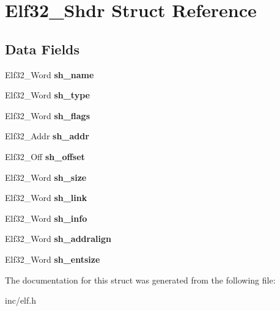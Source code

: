 \hypertarget{structElf32__Shdr}{}\section{Elf32\+\_\+\+Shdr Struct Reference}
\label{structElf32__Shdr}
\subsection*{Data Fields}
\begin{DoxyCompactItemize}
\item 
Elf32\+\_\+\+Word {\bfseries sh\+\_\+name}\hypertarget{structElf32__Shdr_a6e8fd300ca473a31d0f65817ce371dfd}{}\label{structElf32__Shdr_a6e8fd300ca473a31d0f65817ce371dfd}

\item 
Elf32\+\_\+\+Word {\bfseries sh\+\_\+type}\hypertarget{structElf32__Shdr_aab6c221dbd7e16987df41280fb915408}{}\label{structElf32__Shdr_aab6c221dbd7e16987df41280fb915408}

\item 
Elf32\+\_\+\+Word {\bfseries sh\+\_\+flags}\hypertarget{structElf32__Shdr_a27e003d8da37de3038a0065577a7743d}{}\label{structElf32__Shdr_a27e003d8da37de3038a0065577a7743d}

\item 
Elf32\+\_\+\+Addr {\bfseries sh\+\_\+addr}\hypertarget{structElf32__Shdr_a7e668a62cee74a2f9c6edabb5f45635a}{}\label{structElf32__Shdr_a7e668a62cee74a2f9c6edabb5f45635a}

\item 
Elf32\+\_\+\+Off {\bfseries sh\+\_\+offset}\hypertarget{structElf32__Shdr_a6e37227a5777cddc0a9dbbb3c2598ec1}{}\label{structElf32__Shdr_a6e37227a5777cddc0a9dbbb3c2598ec1}

\item 
Elf32\+\_\+\+Word {\bfseries sh\+\_\+size}\hypertarget{structElf32__Shdr_a84dc67bb0ab65880bbcd74fbee722ff1}{}\label{structElf32__Shdr_a84dc67bb0ab65880bbcd74fbee722ff1}

\item 
Elf32\+\_\+\+Word {\bfseries sh\+\_\+link}\hypertarget{structElf32__Shdr_ad759308388eb14c5c6e4d636c38999da}{}\label{structElf32__Shdr_ad759308388eb14c5c6e4d636c38999da}

\item 
Elf32\+\_\+\+Word {\bfseries sh\+\_\+info}\hypertarget{structElf32__Shdr_aef63fe62c2c9927f374c4f987954c6e5}{}\label{structElf32__Shdr_aef63fe62c2c9927f374c4f987954c6e5}

\item 
Elf32\+\_\+\+Word {\bfseries sh\+\_\+addralign}\hypertarget{structElf32__Shdr_a399f50b3591e6286d4ad819f790979ed}{}\label{structElf32__Shdr_a399f50b3591e6286d4ad819f790979ed}

\item 
Elf32\+\_\+\+Word {\bfseries sh\+\_\+entsize}\hypertarget{structElf32__Shdr_a10c59cecc928aae27930601fe545d3ca}{}\label{structElf32__Shdr_a10c59cecc928aae27930601fe545d3ca}

\end{DoxyCompactItemize}


The documentation for this struct was generated from the following file\+:\begin{DoxyCompactItemize}
\item 
inc/elf.\+h\end{DoxyCompactItemize}
